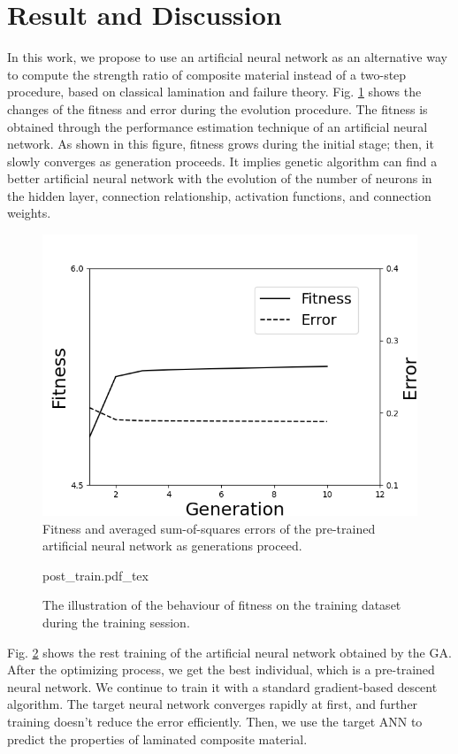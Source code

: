\section{Result and Discussion}

In this work, we propose to use an artificial neural network as an alternative
way to compute the strength ratio of composite material instead of a two-step
procedure, based on classical lamination and failure theory.
Fig. \ref{fig:ga_nn} shows the changes of the fitness and error during the
evolution procedure. The fitness is obtained through the performance estimation
technique of an artificial neural network. As shown in this figure, fitness
grows during the initial stage; then, it slowly converges as generation
proceeds. It implies genetic algorithm can find a better artificial neural
network with the evolution of the number of neurons in the hidden layer,
connection relationship, activation functions, and connection weights.

\begin{figure}[!tb]
	\includegraphics[width=0.9\linewidth]{./fig/result_ga_ann.png}
	\caption{Fitness and averaged sum-of-squares errors of the pre-trained artificial neural network as generations proceed.}
	\label{fig:ga_nn}
\end{figure}

\begin{figure}[!tb]
	\centering
	\def\svgwidth{\columnwidth}
	{post_train.pdf_tex}
	\caption{The illustration of the behaviour of fitness on the training dataset during the training session.}
	\label{fig:final_train}
\end{figure}


Fig. \ref{fig:final_train} shows the rest training of the artificial neural
network obtained by the GA. After the optimizing process, we get the best
individual, which is a pre-trained neural network. We continue to train it with
a standard gradient-based descent algorithm. The target neural network
converges rapidly at first, and further training doesn’t reduce the error
efficiently.  Then, we use the target ANN to predict the properties of
laminated composite material.

